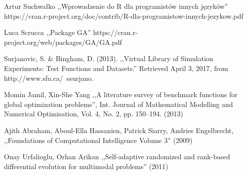 \documentclass[11pt, a4paper]{article}
\begin{document}
\newpage
\begin{thebibliography}{40}

Artur Suchwałko ,,Wprowadzenie do R dla programistów innych języków'' https://cran.r-project.org/doc/contrib/R-dla-programistow-innych-jezykow.pdf

Luca Scrucca ,,Package GA''
https://cran.r-project.org/web/packages/GA/GA.pdf

Surjanovic, S. \& Bingham, D. (2013). ,,Virtual Library of Simulation Experiments: Test Functions and Datasets.'' Retrieved April 3, 2017, from http://www.sfu.ca/~ssurjano.

Momin Jamil, Xin-She Yang ,,A literature survey of benchmark functions for global optimization problems'', Int. Journal of Mathematical Modelling and Numerical Optimisation, Vol. 4, No. 2, pp. 150–194. (2013)

Ajith Abraham, Aboul-Ella Hassanien, Patrick Siarry, Andries Engelbrecht, ,,Foundations of Computational Intelligence Volume 3'' (2009)

Onay Urfalioglu, Orhan Arikan ,,Self-adaptive randomized and rank-based differential evolution for multimodal problems'' (2011)

\end{thebibliography}
\end{document}
